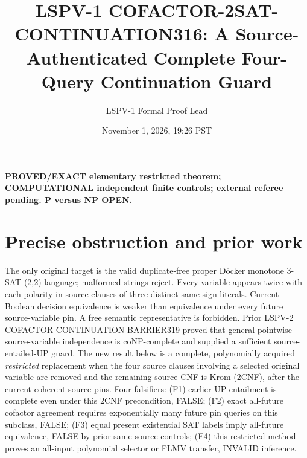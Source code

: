 \documentclass[11pt]{article}
\title{LSPV-1 COFACTOR-2SAT-CONTINUATION316: A Source-Authenticated Complete Four-Query Continuation Guard}
\author{LSPV-1 Formal Proof Lead}
\date{November 1, 2026, 19:26 PST}
\begin{document}
\maketitle
\noindent\textbf{PROVED/EXACT elementary restricted theorem; COMPUTATIONAL independent finite controls; external referee pending. P versus NP OPEN.}
\section{Precise obstruction and prior work}
The only original target is the valid duplicate-free proper D\"ocker monotone 3-SAT-(2,2) language; malformed strings reject. Every variable appears twice with each polarity in source clauses of three distinct same-sign literals. Current Boolean decision equivalence is weaker than equivalence under every future source-variable pin. A free semantic representative is forbidden. Prior LSPV-2 COFACTOR-CONTINUATION-BARRIER319 proved that general pointwise source-variable independence is coNP-complete and supplied a sufficient source-entailed-UP guard. The new result below is a complete, polynomially acquired \emph{restricted} replacement when the four source clauses involving a selected original variable are removed and the remaining source CNF is Krom (2CNF), after the current coherent source pins.
Four falsifiers: (F1) earlier UP-entailment is complete even under this 2CNF precondition, FALSE; (F2) exact all-future cofactor agreement requires exponentially many future pin queries on this subclass, FALSE; (F3) equal present existential SAT labels imply all-future equivalence, FALSE by prior same-source controls; (F4) this restricted method proves an all-input polynomial selector or FLMV transfer, INVALID inference.
\end{document}
